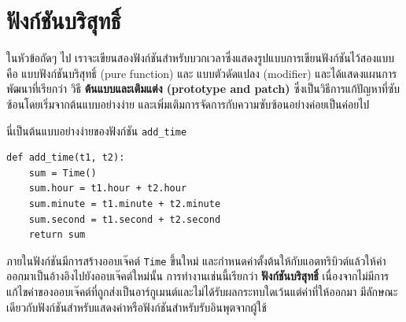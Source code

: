 \section{ฟังก์ชันบริสุทธิ์} %



ในหัวข้อถัดๆ ไป เราจะเขียนสองฟังก์ชันสำหรับบวกเวลาซึ่งแสดงรูปแบบการเขียนฟังก์ชันไว้สองแบบคือ 
แบบฟังก์ชันบริสุทธิ์ (pure function) และ แบบตัวดัดแปลง (modifier) และได้แสดงแผนการพัฒนาที่เรียกว่า วิธี
{\bf ต้นแบบและเติมแต่ง (prototype and patch)} ซึ่งเป็นวิธีการแก้ปัญหาที่ซับซ้อนโดยเริ่มจากต้นแบบอย่างง่าย 
และเพิ่มเติมการจัดการกับความซับซ้อนอย่างค่อยเป็นค่อยไป

นี่เป็นต้นแบบอย่างง่ายของฟังก์ชัน \verb"add_time"

\begin{verbatim}
def add_time(t1, t2):
    sum = Time()
    sum.hour = t1.hour + t2.hour
    sum.minute = t1.minute + t2.minute
    sum.second = t1.second + t2.second
    return sum
\end{verbatim}
%

ภายในฟังก์ชันมีการสร้างออบเจ๊คต์ {\tt Time} ขึ้นใหม่ และกำหนดค่าตั้งต้นให้กับแอตทริบิวต์แล้วให้ค่าออกมาเป็นอ้างอิงไปยังออบเจ๊คต์ใหม่นั้น 
การทำงานเช่นนี้เรียกว่า {\bf ฟังก์ชันบริสุทธิ์} เนื่องจากไม่มีการแก้ไขค่าของออบเจ๊คต์ที่ถูกส่งเป็นอาร์กูเมนต์และไม่ได้รับผลกระทบใดเว้นแต่ค่าที่ให้ออกมา 
มีลักษณะเดียวกับฟังก์ชันสำหรับแสดงค่าหรือฟังก์ชันสำหรับรับอินพุตจากผู้ใช้



